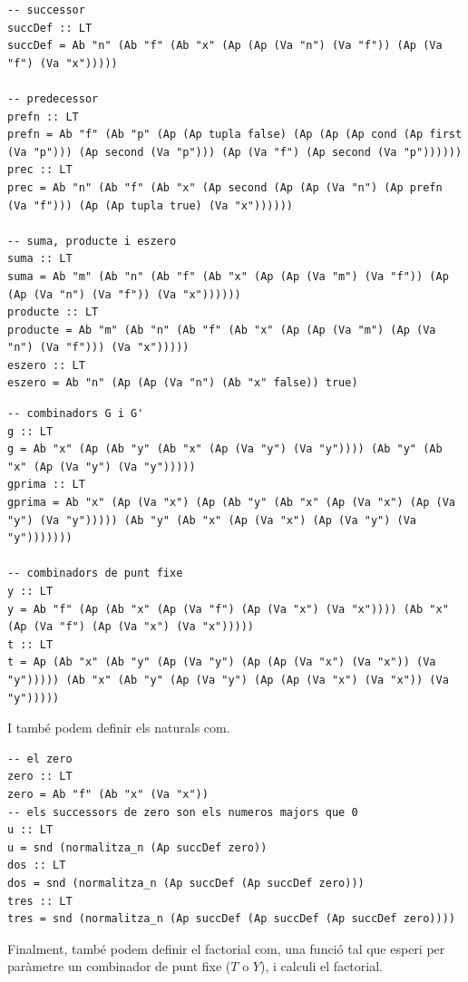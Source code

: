 \documentclass[10pt,a4paper]{article}
\begin{document}
\lstset{language=Haskell, breaklines=true, basicstyle=\footnotesize}
\begin{lstlisting}[frame=mystyle]
-- successor
succDef :: LT
succDef = Ab "n" (Ab "f" (Ab "x" (Ap (Ap (Va "n") (Va "f")) (Ap (Va "f") (Va "x")))))

-- predecessor
prefn :: LT
prefn = Ab "f" (Ab "p" (Ap (Ap tupla false) (Ap (Ap (Ap cond (Ap first (Va "p"))) (Ap second (Va "p"))) (Ap (Va "f") (Ap second (Va "p"))))))
prec :: LT
prec = Ab "n" (Ab "f" (Ab "x" (Ap second (Ap (Ap (Va "n") (Ap prefn (Va "f"))) (Ap (Ap tupla true) (Va "x"))))))

-- suma, producte i eszero
suma :: LT
suma = Ab "m" (Ab "n" (Ab "f" (Ab "x" (Ap (Ap (Va "m") (Va "f")) (Ap (Ap (Va "n") (Va "f")) (Va "x"))))))
producte :: LT
producte = Ab "m" (Ab "n" (Ab "f" (Ab "x" (Ap (Ap (Va "m") (Ap (Va "n") (Va "f"))) (Va "x")))))
eszero :: LT
eszero = Ab "n" (Ap (Ap (Va "n") (Ab "x" false)) true)
\end{lstlisting}

\clearpage

\lstset{language=Haskell, breaklines=true, basicstyle=\footnotesize}
\begin{lstlisting}[frame=mystyle]
-- combinadors G i G'
g :: LT
g = Ab "x" (Ap (Ab "y" (Ab "x" (Ap (Va "y") (Va "y")))) (Ab "y" (Ab "x" (Ap (Va "y") (Va "y")))))
gprima :: LT
gprima = Ab "x" (Ap (Va "x") (Ap (Ab "y" (Ab "x" (Ap (Va "x") (Ap (Va "y") (Va "y"))))) (Ab "y" (Ab "x" (Ap (Va "x") (Ap (Va "y") (Va "y")))))))

-- combinadors de punt fixe
y :: LT
y = Ab "f" (Ap (Ab "x" (Ap (Va "f") (Ap (Va "x") (Va "x")))) (Ab "x" (Ap (Va "f") (Ap (Va "x") (Va "x")))))
t :: LT
t = Ap (Ab "x" (Ab "y" (Ap (Va "y") (Ap (Ap (Va "x") (Va "x")) (Va "y"))))) (Ab "x" (Ab "y" (Ap (Va "y") (Ap (Ap (Va "x") (Va "x")) (Va "y")))))
\end{lstlisting}

I també podem definir els naturals com.

\lstset{language=Haskell, breaklines=true, basicstyle=\footnotesize}
\begin{lstlisting}[frame=mystyle]
-- el zero
zero :: LT
zero = Ab "f" (Ab "x" (Va "x"))
-- els successors de zero son els numeros majors que 0
u :: LT
u = snd (normalitza_n (Ap succDef zero))
dos :: LT
dos = snd (normalitza_n (Ap succDef (Ap succDef zero)))
tres :: LT
tres = snd (normalitza_n (Ap succDef (Ap succDef (Ap succDef zero))))
\end{lstlisting}

Finalment, també podem definir el factorial com, una funció tal que esperi per paràmetre un combinador de punt fixe ($T$ o $Y$), i calculi el factorial.
\end{document}
